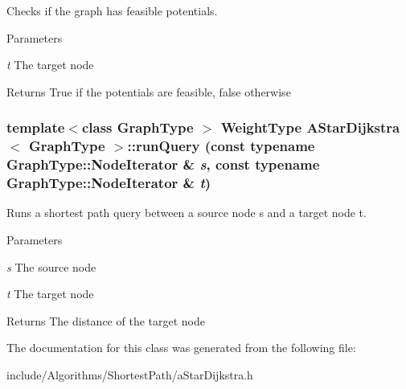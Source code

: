 Checks if the graph has feasible potentials. 


\begin{DoxyParams}{Parameters}
\item[{\em t}]The target node \end{DoxyParams}
\begin{DoxyReturn}{Returns}
True if the potentials are feasible, false otherwise 
\end{DoxyReturn}
\hypertarget{class_a_star_dijkstra_a8a11eb938a4608e119e6fb8ebd82e097}{
\subsubsection[{runQuery}]{\setlength{\rightskip}{0pt plus 5cm}template$<$class GraphType $>$ WeightType {\bf AStarDijkstra}$<$ GraphType $>$::runQuery (const typename GraphType::NodeIterator \& {\em s}, \/  const typename GraphType::NodeIterator \& {\em t})}}
\label{class_a_star_dijkstra_a8a11eb938a4608e119e6fb8ebd82e097}


Runs a shortest path query between a source node s and a target node t. 


\begin{DoxyParams}{Parameters}
\item[{\em s}]The source node \item[{\em t}]The target node \end{DoxyParams}
\begin{DoxyReturn}{Returns}
The distance of the target node 
\end{DoxyReturn}


The documentation for this class was generated from the following file:\begin{DoxyCompactItemize}
\item 
include/Algorithms/ShortestPath/aStarDijkstra.h\end{DoxyCompactItemize}
